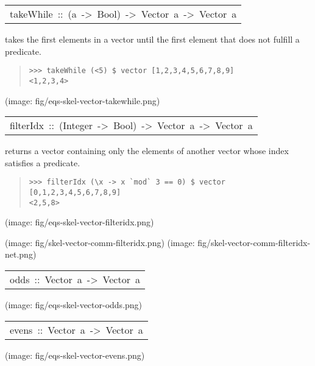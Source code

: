 \begin{haddockdesc}
\item[\begin{tabular}{@{}l}
takeWhile\ ::\ (a\ ->\ Bool)\ ->\ Vector\ a\ ->\ Vector\ a
\end{tabular}]\haddockbegindoc
takes the first elements in a vector until the first element that
 does not fulfill a predicate.\par
\begin{quote}
{\haddockverb\begin{verbatim}
>>> takeWhile (<5) $ vector [1,2,3,4,5,6,7,8,9]
<1,2,3,4>

\end{verbatim}}
\end{quote}(image: fig/eqs-skel-vector-takewhile.png)\par
           
\end{haddockdesc}
\begin{haddockdesc}
\item[\begin{tabular}{@{}l}
filterIdx\ ::\ (Integer\ ->\ Bool)\ ->\ Vector\ a\ ->\ Vector\ a
\end{tabular}]\haddockbegindoc
returns a vector containing only the elements of another vector
 whose index satisfies a predicate.\par
\begin{quote}
{\haddockverb\begin{verbatim}
>>> filterIdx (\x -> x `mod` 3 == 0) $ vector [0,1,2,3,4,5,6,7,8,9]
<2,5,8>

\end{verbatim}}
\end{quote}(image: fig/eqs-skel-vector-filteridx.png)\par
           (image: fig/skel-vector-comm-filteridx.png)
 (image: fig/skel-vector-comm-filteridx-net.png)\par
           
\end{haddockdesc}
\begin{haddockdesc}
\item[\begin{tabular}{@{}l}
odds\ ::\ Vector\ a\ ->\ Vector\ a
\end{tabular}]\haddockbegindoc
(image: fig/eqs-skel-vector-odds.png)\par

\end{haddockdesc}
\begin{haddockdesc}
\item[\begin{tabular}{@{}l}
evens\ ::\ Vector\ a\ ->\ Vector\ a
\end{tabular}]\haddockbegindoc
(image: fig/eqs-skel-vector-evens.png)\par

\end{haddockdesc}
